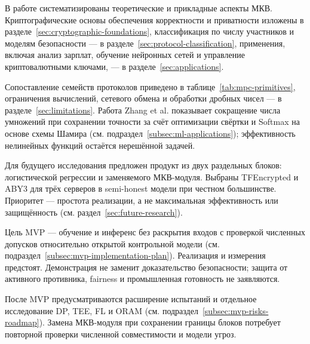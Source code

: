 \conclusion
В работе систематизированы теоретические и прикладные аспекты МКВ. Криптографические основы обеспечения корректности и приватности изложены в разделе~\ref{sec:cryptographic-foundations}, классификация по числу участников и моделям безопасности --- в разделе~\ref{sec:protocol-classification}, применения, включая анализ зарплат, обучение нейронных сетей и управление криптовалютными ключами, --- в разделе~\ref{sec:applications}.

Сопоставление семейств протоколов приведено в таблице~\ref{tab:mpc-primitives}, ограничения вычислений, сетевого обмена и обработки дробных чисел --- в разделе~\ref{sec:limitations}. Работа Zhang et al. показывает сокращение числа умножений при сохранении точности за счёт оптимизации свёртки и Softmax на основе схемы Шамира (см. подраздел~\ref{subsec:ml-applications}); эффективность нелинейных функций остаётся нерешённой задачей.

Для будущего исследования предложен продукт из двух раздельных блоков: логистической регрессии и заменяемого МКВ-модуля. Выбраны TFEncrypted и ABY3 для трёх серверов в semi-honest модели при честном большинстве. Приоритет --- простота реализации, а не максимальная эффективность или защищённость (см. раздел~\ref{sec:future-research}).

Цель MVP --- обучение и инференс без раскрытия входов с проверкой численных допусков относительно открытой контрольной модели (см. подраздел~\ref{subsec:mvp-implementation-plan}). Реализация и измерения предстоят. Демонстрация не заменит доказательство безопасности; защита от активного противника, fairness и промышленная готовность не заявляются.

После MVP предусматриваются расширение испытаний и отдельное исследование DP, TEE, FL и ORAM (см. подраздел~\ref{subsec:mvp-risks-roadmap}). Замена МКВ-модуля при сохранении границы блоков потребует повторной проверки численной совместимости и модели угроз.
